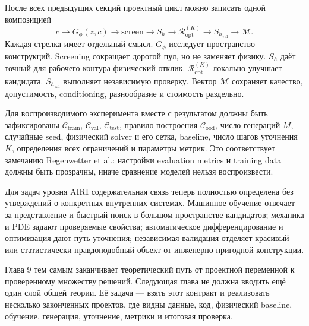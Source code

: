 После всех предыдущих секций проектный цикл можно записать одной композицией
\begin{equation}
 \boxed{
 c
 \longrightarrow
 G_\phi(z,c)
 \longrightarrow
 \text{screen}
 \longrightarrow
 S_h
 \longrightarrow
 \mathcal R_{\mathrm{opt}}^{(K)}
 \longrightarrow
 S_{h_{\mathrm{val}}}
 \longrightarrow
 \mathcal M
 }.
\end{equation}
Каждая стрелка имеет отдельный смысл. $G_\phi$ исследует пространство конструкций. Screening сокращает дорогой пул, но не заменяет физику. $S_h$ даёт точный для рабочего контура физический отклик. $\mathcal R_{\mathrm{opt}}^{(K)}$ локально улучшает кандидата. $S_{h_{\mathrm{val}}}$ выполняет независимую проверку. Вектор $\mathcal M$ сохраняет качество, допустимость, conditioning, разнообразие и стоимость раздельно.

Для воспроизводимого эксперимента вместе с результатом должны быть зафиксированы $\mathcal C_{\mathrm{train}}$, $\mathcal C_{\mathrm{val}}$, $\mathcal C_{\mathrm{test}}$, правило построения $\mathcal C_{\mathrm{ood}}$, число генераций $M$, случайные seed, физический solver и его сетка, baseline, число шагов уточнения $K$, определения всех ограничений и параметры метрик. Это соответствует замечанию Regenwetter et al.: настройки evaluation metrics и training data должны быть прозрачны, иначе сравнение моделей нельзя воспроизвести.

Для задач уровня AIRI содержательная связь теперь полностью определена без утверждений о конкретных внутренних системах. Машинное обучение отвечает за представление и быстрый поиск в большом пространстве кандидатов; механика и PDE задают проверяемые свойства; автоматическое дифференцирование и оптимизация дают путь уточнения; независимая валидация отделяет красивый или статистически правдоподобный объект от инженерно пригодной конструкции.

Глава 9 тем самым заканчивает теоретический путь от проектной переменной к проверенному множеству решений. Следующая глава не должна вводить ещё один слой общей теории. Её задача --- взять этот контракт и реализовать несколько законченных проектов, где видны данные, код, физический baseline, обучение, генерация, уточнение, метрики и итоговая проверка.
